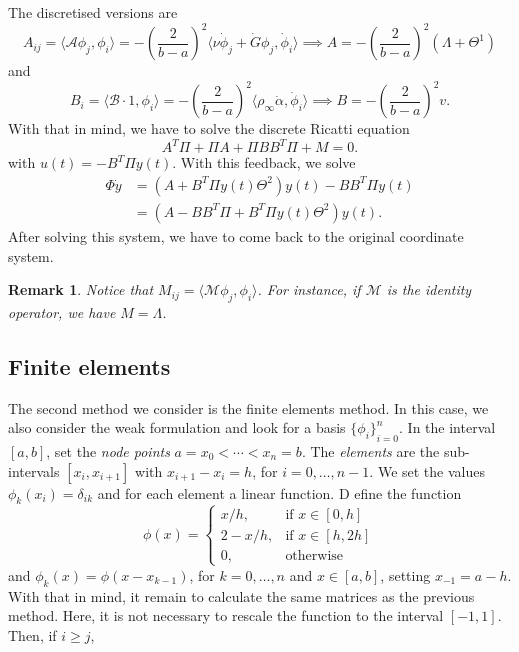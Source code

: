 \documentclass[12pt]{article}
\newcommand{\A}{\mathcal{A}}
\newcommand{\B}{\mathcal{B}}
\newcommand{\steady}{\rho_{\infty}}
\newcommand{\inner}[2]{\langle{} #1, #2 \rangle{}}
\newtheorem{remark}{Remark}[subsection]
\theoremstyle{definition}
\begin{document}
The discretised versions are 
\[
A_{ij} = \inner{\A \phi_j}{\phi_i} = -{\left(\frac{2}{b-a}\right)}^2\inner{\nu \dot \phi_j + \dot G \phi_j}{\dot \phi_i} \implies A = -{\left(\frac{2}{b-a}\right)}^2(\Lambda + \Theta^1)
\]
and 
\[
B_{i} = \inner{\B\cdot 1}{\phi_i} = -{\left(\frac{2}{b-a}\right)}^2\inner{\steady \dot\alpha}{\dot\phi_i} \implies B = -{\left(\frac{2}{b-a}\right)}^2 v.
\]
With that in mind, we have to solve the discrete Ricatti equation
\[
A^T\Pi + \Pi A + \Pi B B^T \Pi + M = 0.
\]
with $u(t) = -B^T\Pi y(t)$. 
With this feedback, we solve
\[
\begin{split}
    \Phi \dot{y} &= (A + B^T\Pi y(t) \Theta^2 )y(t) - BB^T\Pi y(t) \\ 
    &= (A - BB^T\Pi  + B^T\Pi y(t) \Theta^2)y(t).
\end{split}
\]
After solving this system, we have to come back to the original coordinate system.

\begin{remark}
    Notice that $M_{ij} = \inner{\mathcal{M} \phi_j}{\phi_i}$.
    For instance, if $\mathcal{M}$ is the identity operator, we have $M = \Lambda$.
\end{remark}

\subsection{Finite elements}

The second method we consider is the finite elements method. 
In this case, we also consider the weak formulation and look for a basis ${\{\phi_i\}}_{i=0}^{n}$.
In the interval $[a,b]$, set the {\em node points\/} $a = x_0 < \cdots < x_n = b$.
The {\em elements\/} are the sub-intervals $[x_i, x_{i+1}]$ with $x_{i+1}-x_i=h$, for $i=0, \dots, n-1$.
We set the values $\phi_k(x_i) = \delta_{ik}$ and for each element a linear function. 
D
efine the function
\[
\phi(x) = \begin{cases}
    x/h, &\text{if } x \in[0,h] \\
    2 - x/h, &\text{if } x \in [h,2h] \\
    0, &\text{otherwise}
\end{cases} 
\]
and $\phi_{k}(x) = \phi(x-x_{k-1})$, for $k=0, \dots, n$ and $x \in [a,b]$, setting $x_{-1} = a-h$.
With that in mind, it remain to calculate the same matrices as the previous method.
Here, it is not necessary to rescale the function to the interval $[-1,1]$.
Then, if $i \ge j$,
\end{document}

